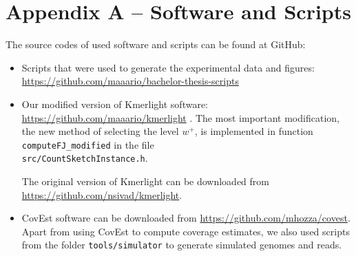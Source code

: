 \chapter*{Appendix A -- Software and Scripts}

The source codes of used software and scripts can be found at GitHub:
\begin{itemize}
\item Scripts that were used to generate the experimental data and figures: \url{https://github.com/maaario/bachelor-thesis-scripts}
\item Our modified version of Kmerlight software: \url{https://github.com/maaario/kmerlight} .
The most important modification, the new method of selecting the level $w^+$, is implemented in
function \texttt{computeFJ\_modified} in the file \\ \texttt{src/CountSketchInstance.h}.

The original version of Kmerlight can be downloaded from \url{https://github.com/nsivad/kmerlight}.

\item CovEst software \cite{Hozza2015} can be downloaded from \url{https://github.com/mhozza/covest}.
Apart from using CovEst to compute coverage estimates, we also used scripts from 
the folder \texttt{tools/simulator} to generate simulated genomes and reads.
\end{itemize}
